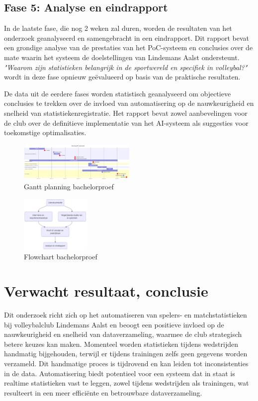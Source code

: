 \subsection{Fase 5: Analyse en eindrapport}
In de laatste fase, die nog 2 weken zal duren, worden de resultaten van het onderzoek geanalyseerd en samengebracht in een eindrapport. Dit rapport bevat een grondige analyse van de prestaties van het PoC-systeem en conclusies over de mate waarin het systeem de doelstellingen van Lindemans Aalst ondersteunt. \textit{"Waarom zijn statistieken belangrijk in de sportwereld en specifiek in volleybal?"} wordt in deze fase opnieuw geëvalueerd op basis van de praktische resultaten.

De data uit de eerdere fases worden statistisch geanalyseerd om objectieve conclusies te trekken over de invloed van automatisering op de nauwkeurigheid en snelheid van statistiekenregistratie. Het rapport bevat zowel aanbevelingen voor de club over de definitieve implementatie van het AI-systeem als suggesties voor toekomstige optimalisaties.

\begin{figure}[ht]
  \centering
  \includegraphics[width=0.5\textwidth]{img/gantt.png}
  \caption{\label{fig:gantt}Gantt planning bachelorproef}
\end{figure}

\begin{figure}[ht]
  \centering
  \includegraphics[width=0.3\textwidth]{img/flowchart.png}
  \caption{\label{fig:flowchart}Flowchart bachelorproef}
\end{figure}

\section{Verwacht resultaat, conclusie}%
\label{sec:verwachte_resultaten}
Dit onderzoek richt zich op het automatiseren van spelers- en matchstatistieken bij volleybalclub Lindemans Aalst en beoogt een positieve invloed op de nauwkeurigheid en snelheid van dataverzameling, waarmee de club strategisch betere keuzes kan maken. Momenteel worden statistieken tijdens wedstrijden handmatig bijgehouden, terwijl er tijdens trainingen zelfs geen gegevens worden verzameld. Dit handmatige proces is tijdrovend en kan leiden tot inconsistenties in de data. Automatisering biedt potentieel voor een systeem dat in staat is realtime statistieken vast te leggen, zowel tijdens wedstrijden als trainingen, wat resulteert in een meer efficiënte en betrouwbare dataverzameling.

